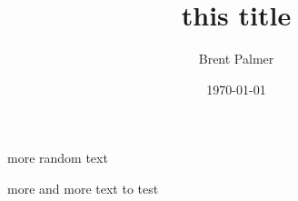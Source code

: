 \documentclass[]{article}
\title{this title}
\author{Brent Palmer}
\date{\today}
\begin{document}
	\maketitle
	
	more random text
	
	more and more text to test
\end{document}
